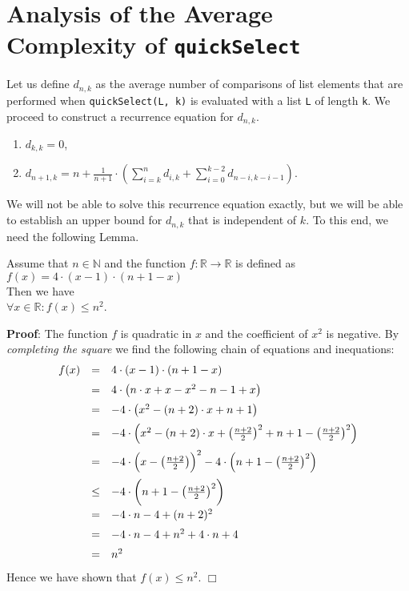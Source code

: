 \documentclass{article}
\newcommand{\ds}{\displaystyle}
\newcommand{\qed}{\hspace*{\fill} $\Box$ \vspace*{0.2cm}}
\begin{document}
\section{Analysis of the Average Complexity of \texttt{quickSelect}}
Let us define $d_{n,k}$ as the average number of comparisons of list elements that are performed when
\texttt{quickSelect(L, k)} is evaluated with a list \texttt{L} of length \texttt{k}.  We proceed to construct a
recurrence equation for $d_{n,k}$.
\begin{enumerate}
\item $\ds d_{k,k} = 0$,
\item $\ds d_{n+1,k} = n + \frac{1}{n+1} \cdot \left(\sum\limits_{i=k}^{n} d_{i,k} + \sum\limits_{i=0}^{k-2} d_{n-i,k-i-1} \right)$.
\end{enumerate}
We will not be able to solve this recurrence equation exactly, but we will be able to establish an upper bound
for $d_{n,k}$ that is independent of $k$.  To this end, we need the following Lemma.

\begin{Lemma}
Assume that $n\in \mathbb{N}$ and the function $f:\mathbb{R} \rightarrow \mathbb{R}$ is defined as
\\[0.2cm]
\hspace*{1.3cm}
$f(x) = 4 \cdot (x - 1) \cdot (n + 1 - x)$
\\[0.2cm]
Then we have 
\\[0.2cm]
\hspace*{1.3cm}
$\forall x \in \mathbb{R}: f(x) \leq n^2$.
\end{Lemma}

\noindent
\textbf{Proof}:  The function $f$ is quadratic in $x$ and the coefficient of $x^2$ is negative.  By
\emph{completing the square} we find the following chain of equations and inequations:
$$
\begin{array}{lcl}
  f(x) & = & 4 \cdot (x - 1) \cdot (n + 1 - x) \\[0.2cm]
       & = & 4 \cdot \bigl(n \cdot x + x - x^2 - n - 1 + x \bigr) \\[0.2cm]
       & = & - 4 \cdot \bigl(x^2 - (n + 2) \cdot x + n + 1 \bigr) \\[0.2cm]
       & = & - 4 \cdot \Bigl(x^2 - (n + 2) \cdot x + \bigl(\frac{n+2}{2}\bigr)^2  +
             n + 1 - \bigl(\frac{n+2}{2}\bigr)^2 \Bigr) \\[0.3cm]
       & = & - 4 \cdot \Bigl(x - \bigl(\frac{n+2}{2}\bigr)\Bigr)^2 
             - 4 \cdot\Bigl( n + 1 - \bigl(\frac{n+2}{2}\bigr)^2 \Bigr) \\[0.3cm]
       & \leq & -4 \cdot \biggl( n + 1 - \bigl(\frac{n+2}{2}\bigr)^2 \biggr) \\[0.3cm]
       & = & -4 \cdot n - 4 + (n + 2)^2  \\[0.2cm]
       & = & -4 \cdot n - 4 + n^2 + 4 \cdot n + 4 \\[0.2cm]
       & = & n^2
\end{array}
$$
Hence we have shown that $f(x) \leq n^2$. \qed
\end{document}
